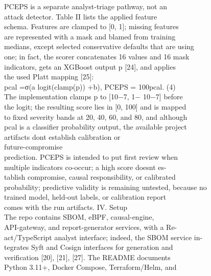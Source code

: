 \documentclass[conference]{IEEEtran}
\begin{document}
PCEPS is a separate analyst-triage pathway, not an\\
attack detector. Table II lists the applied feature\\
schema. Features are clamped to {[}0, 1{]}; missing features\\
are represented with a mask and blamed from training\\
medians, except selected conservative defaults that are using\\
one; in fact, the scorer concatenates 16 values and 16 mask\\
indicators, gets an XGBoost output p {[}24{]}, and applies\\
the used Platt mapping {[}25{]}:\\
pcal =σ(a logit(clamp(p)) +b), PCEPS = 100pcal. (4)\\
The implementation clamps p to {[}10−7, 1− 10−7{]} before\\
the logit; the resulting score lies in {[}0, 100{]} and is mapped\\
to fixed severity bands at 20, 40, 60, and 80, and although\\
pcal is a classifier probability output, the available project\\
artifacts don\textquotesingle t establish calibration or\\
future-compromise\\
prediction. PCEPS is intended to put first review when\\
multiple indicators co-occur; a high score doesn\textquotesingle t es-\\
tablish compromise, causal responsibility, or calibrated\\
probability; predictive validity is remaining untested, because no\\
trained model, held-out labels, or calibration report\\
comes with the run artifacts. IV. Setup\\
The repo contains SBOM, eBPF, causal-engine,\\
API-gateway, and report-generator services, with a Re-\\
act/TypeScript analyst interface; indeed, the SBOM service in-\\
tegrates Syft and Cosign interfaces for generation and\\
verification {[}20{]}, {[}21{]}, {[}27{]}. The README documents\\
Python 3.11+, Docker Compose, Terraform/Helm, and\\
\end{document}
